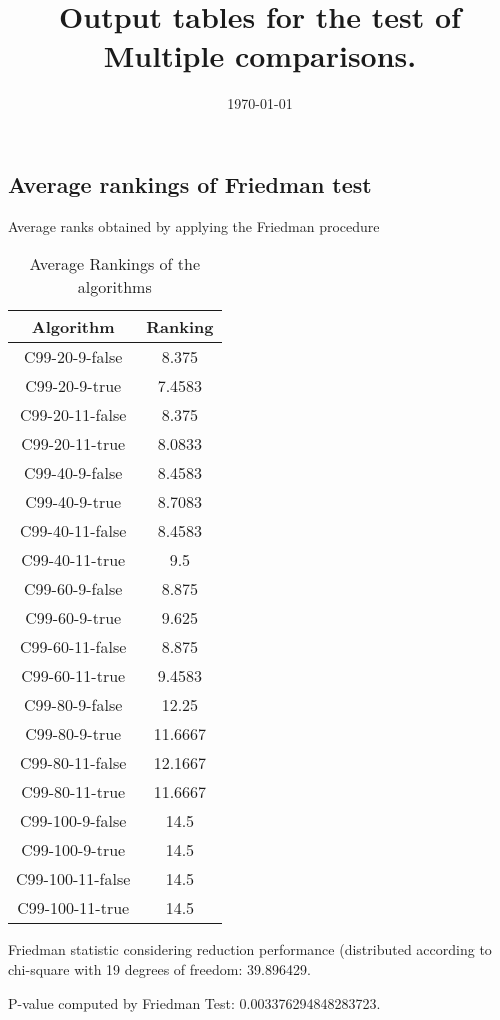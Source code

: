 \documentclass[a4paper,10pt]{article}
\title{Output tables for the test of Multiple comparisons.}
\author{}
\date{\today}
\begin{document}
\begin{landscape}
\pagestyle{empty}
\maketitle
\thispagestyle{empty}
\section{Average rankings of Friedman test}



Average ranks obtained by applying the Friedman procedure

\begin{table}[!htp]
\centering
\begin{tabular}{|c|c|}\hline
Algorithm&Ranking\\\hline
C99-20-9-false & 8.375\\
C99-20-9-true & 7.4583\\
C99-20-11-false & 8.375\\
C99-20-11-true & 8.0833\\
C99-40-9-false & 8.4583\\
C99-40-9-true & 8.7083\\
C99-40-11-false & 8.4583\\
C99-40-11-true & 9.5\\
C99-60-9-false & 8.875\\
C99-60-9-true & 9.625\\
C99-60-11-false & 8.875\\
C99-60-11-true & 9.4583\\
C99-80-9-false & 12.25\\
C99-80-9-true & 11.6667\\
C99-80-11-false & 12.1667\\
C99-80-11-true & 11.6667\\
C99-100-9-false & 14.5\\
C99-100-9-true & 14.5\\
C99-100-11-false & 14.5\\
C99-100-11-true & 14.5\\
\hline
\end{tabular}
\caption{Average Rankings of the algorithms}
\end{table}

Friedman statistic considering reduction performance (distributed according to chi-square with 19 degrees of freedom: 39.896429.

P-value computed by Friedman Test: 0.003376294848283723.\newline




\end{landscape}
\end{document}
